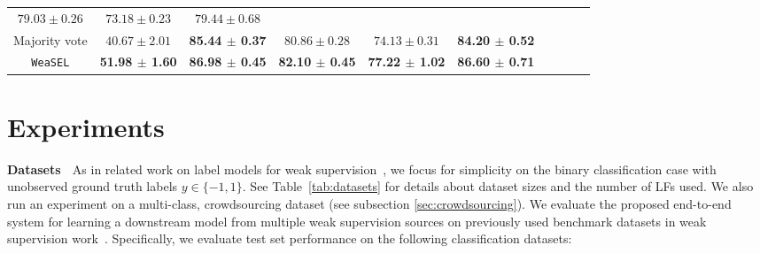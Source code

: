 \documentclass{article}
\newcommand{\weasel}{\texttt{WeaSEL}}\newcommand{\brackets}[1]{\left( #1 \right)}
\newcommand{\first}[1]{{\color{blue}\textbf{#1}}}
\newcommand{\second}[1]{{\textbf{#1}}}
\begin{document}
\begin{table*}
{\begin{tabular}{c|ccccccccc|}
            $79.03 \pm 0.26$ &
            $73.18 \pm 0.23$ &
            $79.44 \pm 0.68$ \\Majority vote &
            $40.67 \pm 2.01$ &
            \second{85.44 $\pm$ 0.37} &
            $80.86 \pm 0.28$ &
            $74.13 \pm 0.31$ &
            \second{84.20 $\pm$ 0.52} \\\cline{1-6}
        \weasel  & 
            \first{51.98 $\pm$ 1.60} &
            \first{86.98 $\pm$ 0.45} &
            \second{82.10 $\pm$ 0.45} &
            \first{77.22 $\pm$ 1.02} &
            \first{86.60 $\pm$ 0.71}\\ \bottomrule
    \end{tabular}
    \label{tab:mainResults}
}
\end{table*}
 
\section{Experiments}
\label{Experiments}
\textbf{Datasets} $\;$
As in related work on label models for weak supervision~\cite{DP, Multitask, triplets, TripletsMean}, we focus for simplicity on the binary classification case with unobserved ground truth labels $y \in \{-1, 1\}$.
See Table~\ref{tab:datasets} for details about dataset sizes and the number of LFs used.
We also run an experiment on a multi-class, crowdsourcing dataset (see subsection \ref{sec:crowdsourcing}).
We evaluate the proposed end-to-end system for learning a downstream model from multiple weak supervision sources on previously used benchmark datasets in weak supervision work~\cite{Snorkel, IWS, TripletsMean}.   Specifically, we evaluate test set performance on the following classification datasets:
\end{document}
